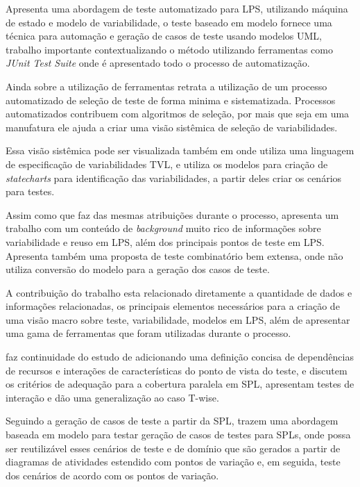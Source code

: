 \cite{garcia2010automated} Apresenta uma abordagem de teste automatizado para LPS, utilizando máquina de estado e modelo de variabilidade, o teste baseado em modelo fornece uma técnica para automação e geração de casos de teste usando modelos UML, trabalho importante contextualizando o método utilizando ferramentas como \textit{JUnit Test Suite} onde é apresentado todo o processo de automatização.

Ainda sobre a utilização de ferramentas \cite{wang2013automated} retrata a utilização de um processo automatizado de seleção de teste de forma minima e sistematizada. Processos automatizados contribuem com algoritmos de seleção, por mais que seja em uma manufatura ele ajuda a criar uma visão sistêmica de seleção de variabilidades. 

Essa visão sistêmica pode ser visualizada também em \cite{devroey2014behavioural} onde utiliza uma linguagem de especificação de variabilidades TVL, e utiliza os modelos para criação de \textit{statecharts} para identificação das variabilidades, a partir deles criar os cenários para testes.

Assim como \cite{oster2012feature} que faz das mesmas atribuições durante o processo, apresenta um trabalho com um conteúdo de \textit{background} muito rico de informações sobre variabilidade e reuso em LPS, além dos principais pontos de teste em LPS. Apresenta também uma proposta de teste combinatório bem extensa, onde não utiliza conversão do modelo para a geração dos casos de teste.

A contribuição do trabalho esta relacionado diretamente a quantidade de dados e informações relacionadas, os principais elementos necessários para a criação de uma visão macro sobre teste, variabilidade, modelos em LPS, além de apresentar uma gama de ferramentas que foram utilizadas durante o processo.

\cite{lochau2012model} faz continuidade do estudo de \cite{oster2011pairwise} adicionando uma definição concisa de dependências de recursos e interações de características do ponto de vista do teste, e discutem os critérios de adequação para a cobertura paralela em SPL, apresentam testes de interação e dão uma generalização ao caso T-wise.

Seguindo a geração de casos de teste a partir da SPL, \cite{cai2013model} trazem uma abordagem baseada em modelo para testar geração de casos de testes para SPLs, onde possa ser reutilizável esses cenários de teste e de domínio que são gerados a partir de diagramas de atividades estendido com pontos de variação e, em seguida, teste dos cenários de acordo com os pontos de variação.

